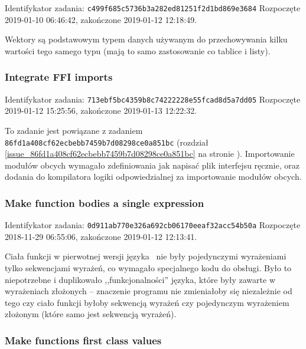 Identifykator zadania: \texttt{c499f685c5736b3a282ed81251f2d1bd869e3684}
\newline
Rozpoczęte 2019-01-10 06:46:42, zakończone 2019-01-12 12:18:49.
\newline

Wektory są podstawowym typem danych używanym do przechowywania kilku wartości
tego samego typu (mają to samo zastosowanie co tablice i listy).

\subsubsection{Integrate FFI imports}

Identifykator zadania: \texttt{713ebf5bc4359b8c74222228e55fcad8d5a7dd05}
\newline
Rozpoczęte 2019-01-12 15:25:56, zakończone 2019-01-13 12:22:32.
\newline

To zadanie jest powiązane z zadaniem \texttt{86fd1a408cf62ecbebb7459b7d08298ce0a851bc}
(rozdział \ref{issue_86fd1a408cf62ecbebb7459b7d08298ce0a851bc} na stronie
\pageref{issue_86fd1a408cf62ecbebb7459b7d08298ce0a851bc}). Importowanie modułów
obcych wymagało zdefiniowania jak napisać plik interfejsu ręcznie, oraz dodania
do kompilatora logiki odpowiedzialnej za importowanie modułów obcych.

\subsubsection{Make function bodies a single expression}

Identifykator zadania: \texttt{0d911ab770e326a692cb06170eeaf32acc54b50a}
\newline
Rozpoczęte 2018-11-29 06:55:06, zakończone 2019-01-12 12:13:41.
\newline

Ciała funkcji w pierwotnej wersji języka \ViuAct\ nie były pojedynczymi
wyrażeniami tylko sekwencjami wyrażeń, co wymagało specjalnego kodu do obsługi.
Było to niepotrzebne i duplikowało ,,funkcjonalności'' języka, które były
zawarte w wyrażeniach złożonych -- znaczenie programu nie zmieniałoby się
niezależnie od tego czy ciało funkcji byłoby sekwencją wyrażeń czy pojedynczym
wyrażeniem złożonym (które samo jest sekwencją wyrażeń).

\subsubsection{Make functions first class values}


